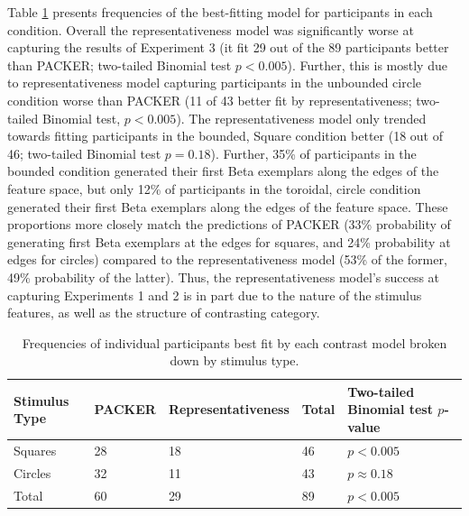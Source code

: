 \documentclass[12pt]{article}
\begin{document}
\begin{flushleft}
Table \ref{table:corner_counts} presents frequencies of the best-fitting model for participants in each condition. Overall the representativeness model was significantly worse at capturing the results of Experiment 3 (it fit 29 out of the 89 participants better than PACKER; two-tailed Binomial test $p < 0.005$). Further, this is mostly due to representativeness model capturing participants in the unbounded circle condition worse than  PACKER (11 of 43 better fit by representativeness; two-tailed Binomial test, $p<0.005$). The representativeness model only trended towards fitting participants in the bounded, Square condition better (18 out of 46; two-tailed Binomial test $p = 0.18$). Further, 35\% of participants in the bounded condition generated their first Beta exemplars along the
edges of the feature space, but only 12\% of participants in the toroidal, circle condition generated their first Beta exemplars along the edges of
the feature space. These proportions more closely match the predictions of
PACKER (33\% probability of generating first Beta exemplars at the edges for
squares, and 24\% probability at edges for circles) compared to the
representativeness model (53\% of the former, 49\% probability of the latter). Thus, the representativeness model's success at capturing Experiments 1 and 2 is in part due to the nature of the stimulus features, as well as the structure of contrasting category.



\begin{table} \centering
  \caption{Frequencies of individual participants best fit by each contrast
    model  broken down by stimulus type.}
\label{table:corner_counts}
\begin{tabular}{ l l l l l} \\ Stimulus Type & \textbf{PACKER} &
                                                               \textbf{Representativeness}& Total & Two-tailed Binomial test $p$-value \\
  \hline 
  Squares & 28 & 18 & 46 & $p < 0.005$\\
  Circles & 32 & 11 & 43 & $p \approx 0.18$\\
  Total   & 60 & 29 & 89 & $p < 0.005$\\
\end{tabular}
\end{table}
\begin{table} \centering
  \caption{Results of model-fitting to the combined datasets from Experiments 1,
    2 and 3. Smaller AIC values correspond to better model fits (adjusted
    for number of parameters.)}
\label{table:corner-model-fits}


\end{table}
\end{flushleft}
\end{document}
